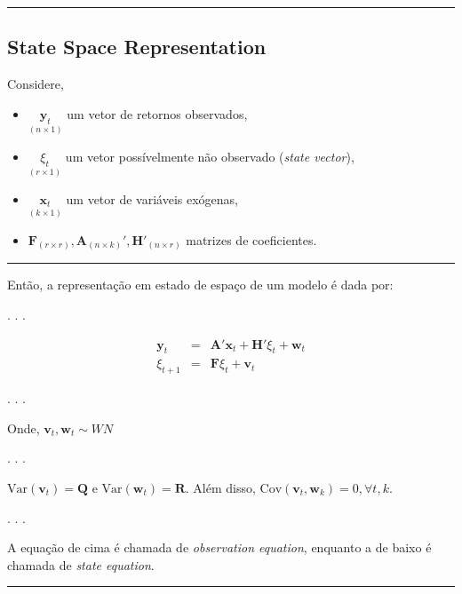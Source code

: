 \documentclass[
  letterpaper,
  DIV=11,
  numbers=noendperiod]{scrartcl}
\providecommand{\tightlist}{%
  \setlength{\itemsep}{0pt}\setlength{\parskip}{0pt}}\usepackage{longtable,booktabs,array}
\begin{document}
\begin{center}\rule{0.5\linewidth}{0.5pt}\end{center}

\subsection{State Space Representation}\label{sec-state-space}

Considere,

\begin{itemize}
\tightlist
\item
  \(\underset{(n \times 1)}{\mathbf{y}_t}\) um vetor de retornos
  observados,
\item
  \(\underset{(r \times 1)}{\xi_t}\) um vetor possívelmente não
  observado (\emph{state vector}),
\item
  \(\underset{(k \times 1)}{\mathbf{x}_t}\) um vetor de variáveis
  exógenas,
\item
  \(\mathbf{F}_{(r \times r)}, \mathbf{A}_{(n \times k)}', \mathbf{H}'_{(n \times r)}\)
  matrizes de coeficientes.
\end{itemize}

\begin{center}\rule{0.5\linewidth}{0.5pt}\end{center}

Então, a representação em estado de espaço de um modelo é dada por:

. . .

\[
\begin{equation}
\begin{array}{ccl}
  \mathbf{y}_t & = & \mathbf{A}'\mathbf{x}_t + \mathbf{H}'\xi_t + \mathbf{w}_t \\
  \xi_{t+1} & = & \mathbf{F}\xi_t + \mathbf{v}_t
\end{array}
\end{equation}
\]

. . .

Onde, \(\mathbf{v}_t,\mathbf{w}_t \sim WN\)

. . .

\(\textrm{Var}(\mathbf{v}_t) = \mathbf{Q}\) e
\(\textrm{Var}(\mathbf{w}_t) = \mathbf{R}\). Além disso,
\(\textrm{Cov}(\mathbf{v}_t,\mathbf{w}_k) = 0, \forall t,k\).

. . .

A equação de cima é chamada de \emph{observation equation}, enquanto a
de baixo é chamada de \emph{state equation}.

\begin{center}\rule{0.5\linewidth}{0.5pt}\end{center}
\end{document}
